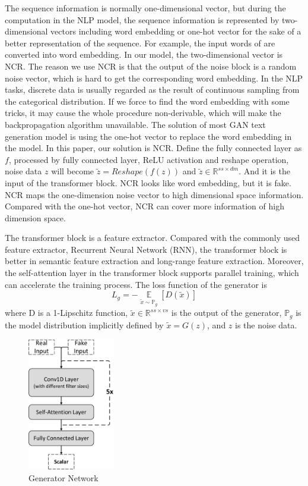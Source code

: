 The sequence information is normally one-dimensional vector, but during the computation in the NLP model, the sequence information is represented by two-dimensional vectors including word embedding or one-hot vector for the sake of a better representation of the sequence. 
For example, the input words of \cite{vaswani2017attention} are converted into word embedding. In our model, the two-dimensional vector is NCR. 
The reason we use NCR is that the output of the noise block is a random noise vector, which is hard to get the corresponding word embedding. In the NLP tasks, discrete data is usually regarded as the result of continuous sampling from the categorical distribution. If we force to find the word embedding with some tricks, it may cause the whole procedure non-derivable, which will make the backpropagation algorithm unavailable. 
The solution of most GAN text generation model is using the one-hot vector to replace the word embedding in the model. In this paper, our solution is NCR. Define the fully connected layer as $f$, processed by fully connected layer, ReLU activation and reshape operation, noise data $z$ will become $\tilde{z} = Reshape(f(z))$ and $ \tilde{z} \in \mathbb{R}^{ss \times {dm}}$. And it is the input of the transformer block.
NCR looks like word embedding, but it is fake. NCR maps the one-dimension noise vector to high dimensional space information. Compared with the one-hot vector, NCR can cover more information of high dimension space.


The transformer block is a feature extractor. Compared with the commonly used feature extractor, Recurrent Neural Network (RNN), the transformer block is better in semantic feature extraction and long-range feature extraction. Moreover, the self-attention layer in the transformer block supports parallel training, which can accelerate the training process.
The loss function of the generator is 
\begin{equation}
L_{g} = - \mathop{\mathbb{E}}\limits_{\tilde{x}\sim\mathbb{P}_{g}}\left [ D(\tilde{x}) \right ] 
\end{equation}
where D is a 1-Lipschitz function, $\tilde{x} \in \mathbb{R}^{ss \times vs}$ is the output of the generator, $\mathbb{P}_g$ is the model distribution implicitly defined by $\tilde{x}=G(z)$, and $z$ is the noise data.

\begin{figure}[htbp]   %
	\centering 
	\includegraphics[width=1.5in]{FigHexGANFuzzer_Critic.pdf}
	\caption{Generator Network}
	\label{FigHexGANFuzzer_Critic}
\end{figure}
